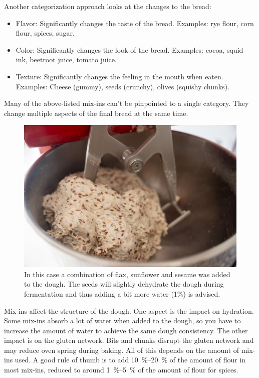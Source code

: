 Another categorization approach looks at the changes to the bread:

\begin{itemize}
  \item Flavor: Significantly changes the taste of the bread. Examples: rye
      flour, corn flour, spices, sugar.
  \item Color: Significantly changes the look of the bread. Examples: cocoa,
      squid ink, beetroot juice, tomato juice.
  \item Texture: Significantly changes the feeling in the mouth when eaten.
      Examples: Cheese (gummy), seeds (crunchy), olives (squishy chunks).
\end{itemize}

Many of the above-listed mix-ins can't be pinpointed to a single category. They
change multiple aspects of the final bread at the same time.

\begin{figure}[htb!]
  \includegraphics[width=\textwidth]{seeded-sourdough}
  \caption[Seeded sourdough]{In this case a combination of flax, sunflower and
    sesame was added to the dough. The seeds will slightly dehydrate the dough
    during fermentation and thus adding a bit more water (1\%) is advised.}%
\end{figure}

Mix-ins affect the structure of the dough. One aspect is the impact on
hydration. Some mix-ins absorb a lot of water when added to the dough, so you
have to increase the amount of water to achieve the same dough consistency.
The other impact is on the gluten network. Bits and chunks disrupt the gluten
network and may reduce oven spring during baking. All of this depends on the amount of mix-ins
used. A good rule of thumb is to add \qtyrange{10}{20}{\percent} of the amount
of flour in most mix-ins, reduced to around \qtyrange{1}{5}{\percent} of the
amount of flour for spices.


